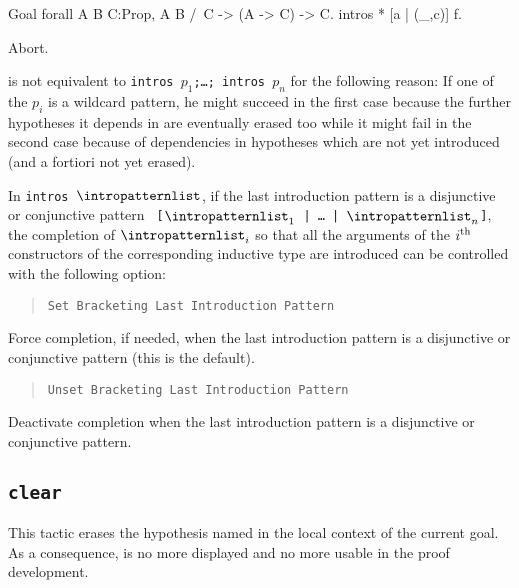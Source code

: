 \begin{coq_example*}
\begin{coq_example}
Goal forall A B C:Prop, A \/ B /\ C -> (A -> C) -> C.
intros * [a | (_,c)] f.
\end{coq_example}
\begin{coq_eval}
Abort.
\end{coq_eval}

 is not equivalent to \texttt{intros
  $p_1$;\ldots; intros $p_n$} for the following reason: If one of the
$p_i$ is a wildcard pattern, he might succeed in the first case
because the further hypotheses it depends in are eventually erased too
while it might fail in the second case because of dependencies in
hypotheses which are not yet introduced (and a fortiori not yet
erased).

\Rem In {\tt intros $\intropatternlist$}, if the last introduction
pattern is a disjunctive or conjunctive pattern {\tt
  [$\intropatternlist_1$ | \dots\ | $\intropatternlist_n$]}, the
completion of $\intropatternlist_i$ so that all the arguments of the
$i^{\mbox{\scriptsize th}}$ constructors of the corresponding
inductive type are introduced can be controlled with the
following option:

\begin{quote}
{\tt Set Bracketing Last Introduction Pattern}
\end{quote}

Force completion, if needed, when the last introduction pattern is a
disjunctive or conjunctive pattern (this is the default).

\begin{quote}
{\tt Unset Bracketing Last Introduction Pattern}
\end{quote}

Deactivate completion when the last introduction pattern is a disjunctive
or conjunctive pattern.



\subsection{\tt clear \ident}
\label{clear}

This tactic erases the hypothesis named {\ident} in the local context
of the current goal. As a consequence, {\ident} is no more displayed and no more
usable in the proof development.

\begin{ErrMsgs}
\item {}
\item {}
\item {}
\end{ErrMsgs}


\end{coq_example*}
